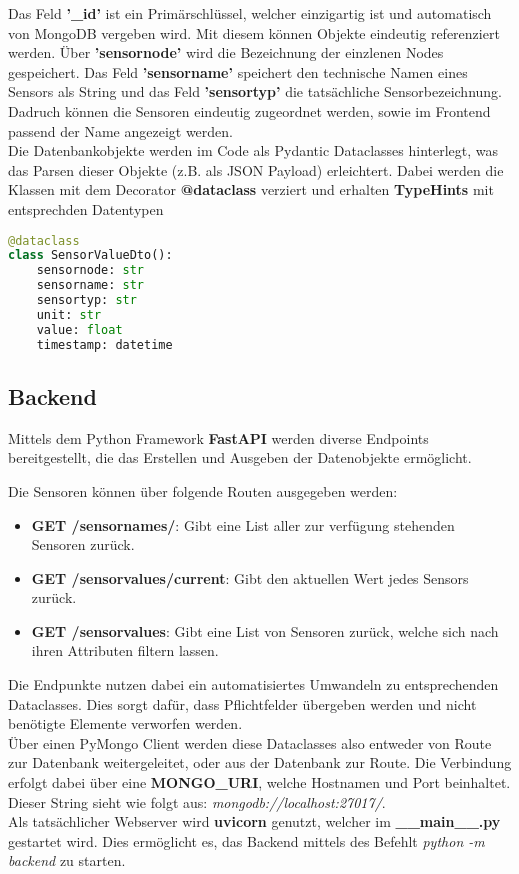 Das Feld \textbf{'\_id'} ist ein Primärschlüssel, welcher einzigartig ist und automatisch von MongoDB vergeben wird. 
Mit diesem können Objekte eindeutig referenziert werden.
Über \textbf{'sensornode'} wird die Bezeichnung der einzlenen Nodes gespeichert.
Das Feld \textbf{'sensorname'} speichert den technische Namen eines Sensors als String und das Feld \textbf{'sensortyp'} die tatsächliche Sensorbezeichnung. 
Dadruch können die Sensoren eindeutig zugeordnet werden, sowie im Frontend passend der Name angezeigt werden. \\

Die Datenbankobjekte werden im Code als Pydantic Dataclasses hinterlegt, was das Parsen dieser Objekte (z.B. als JSON Payload) erleichtert. 
Dabei werden die Klassen mit dem Decorator \textbf{@dataclass} verziert und erhalten \textbf{TypeHints} mit entsprechden Datentypen

\begin{lstlisting}[language=python,caption={Sensor Dataclass},captionpos=b,showstringspaces=false, basicstyle=\small,label={lst:dataclass}]
@dataclass
class SensorValueDto():
    sensornode: str
    sensorname: str
    sensortyp: str
    unit: str
    value: float
    timestamp: datetime
\end{lstlisting}

\subsection{Backend}
Mittels dem Python Framework \textbf{FastAPI} werden diverse Endpoints bereitgestellt, die das Erstellen und Ausgeben der Datenobjekte ermöglicht.

Die Sensoren können über folgende Routen ausgegeben werden:
\begin{itemize}
\item \textbf{GET /sensornames/}: Gibt eine List aller zur verfügung stehenden Sensoren zurück.
\item \textbf{GET /sensorvalues/current}: Gibt den aktuellen Wert jedes Sensors zurück.
\item \textbf{GET /sensorvalues}: Gibt eine List von Sensoren zurück, welche sich nach ihren Attributen filtern lassen.
\end{itemize}

Die Endpunkte nutzen dabei ein automatisiertes Umwandeln zu entsprechenden Dataclasses.
Dies sorgt dafür, dass Pflichtfelder übergeben werden und nicht benötigte Elemente verworfen werden.\\
Über einen PyMongo Client werden diese Dataclasses also entweder von Route zur Datenbank weitergeleitet, oder aus der Datenbank zur Route.
Die Verbindung erfolgt dabei über eine \textbf{MONGO\_URI}, welche Hostnamen und Port beinhaltet. Dieser String sieht wie folgt aus: \textit{mongodb://localhost:27017/}. \\
Als tatsächlicher Webserver wird \textbf{uvicorn} genutzt, welcher im \textbf{\_\_main\_\_.py} gestartet wird. Dies ermöglicht es, das Backend mittels des Befehlt \textit{python -m backend} zu starten.

